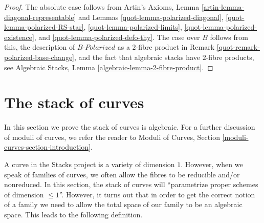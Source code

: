 \begin{proof}

The absolute case follows from
Artin's Axioms, Lemma \ref{artin-lemma-diagonal-representable}
and Lemmas \ref{quot-lemma-polarized-diagonal},
\ref{quot-lemma-polarized-RS-star},
\ref{quot-lemma-polarized-limits},
\ref{quot-lemma-polarized-existence}, and
\ref{quot-lemma-polarized-defo-thy}.
The case over $B$ follows from this, the description of
$B\textit{-Polarized}$ as a $2$-fibre product in
Remark \ref{quot-remark-polarized-base-change}, and the fact
that algebraic stacks have $2$-fibre products, see
Algebraic Stacks, Lemma \ref{algebraic-lemma-2-fibre-product}.
\end{proof}

\section{The stack of curves}
\label{quot-section-curves}
In this section we prove the stack of curves is algebraic. For
a further discussion of moduli of curves, we refer the reader
to Moduli of Curves, Section \ref{moduli-curves-section-introduction}.

\medskip\noindent
A curve in the Stacks project is a variety of dimension $1$.
However, when we speak of families of curves, we often allow
the fibres to be reducible and/or nonreduced. In this section,
the stack of curves will ``parametrize proper schemes of
dimension $\leq 1$''. However, it turns out that in order
to get the correct notion of a family we need to allow the
total space of our family to be an algebraic space.
This leads to the following definition.

